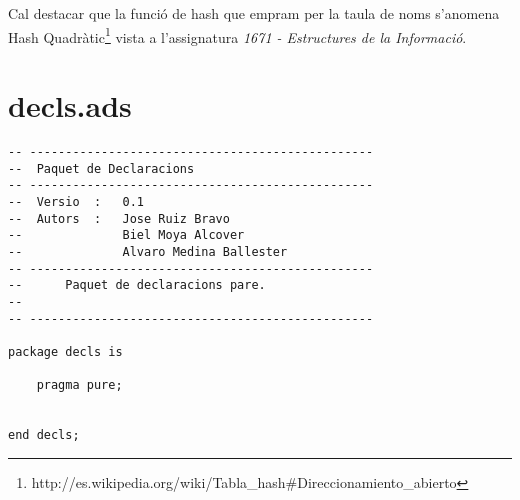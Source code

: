 \documentclass[10pt]{report}
\begin{document}
        Cal destacar que la funció de hash que empram per la taula de noms s'anomena Hash Quadràtic\footnote{http://es.wikipedia.org/wiki/Tabla\_hash\#Direccionamiento\_abierto} vista a l'assignatura \textit{1671 - Estructures de la Informació}.
    \newpage
    \section{decls.ads}
    \begin{lstlisting}[style=Ada]
-- ------------------------------------------------
--  Paquet de Declaracions
-- ------------------------------------------------
--  Versio  :   0.1
--  Autors  :   Jose Ruiz Bravo
--              Biel Moya Alcover
--              Alvaro Medina Ballester
-- ------------------------------------------------
--      Paquet de declaracions pare.
--
-- ------------------------------------------------

package decls is

    pragma pure;


end decls;
    \end{lstlisting}
    
    \newpage
\end{document}
